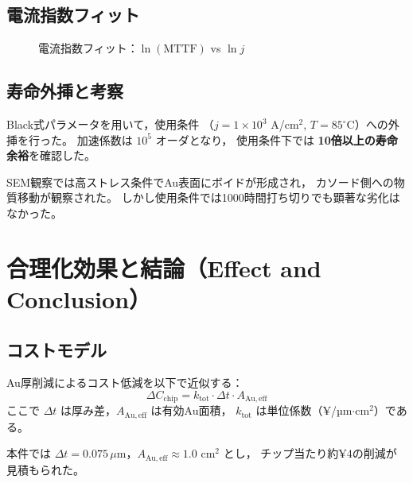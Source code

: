 \documentclass[conference]{IEEEtran}
\begin{document}
\subsection{電流指数フィット}
\begin{figure}[htbp]
  \centering
  \caption{電流指数フィット：$\ln(\mathrm{MTTF})$ vs $\ln j$}
  \label{fig:em-j}
\end{figure}

\subsection{寿命外挿と考察}
Black式パラメータを用いて，使用条件
（$j=1\times10^3$ A/cm$^2$, $T=85^\circ$C）への外挿を行った。
加速係数は $10^5$ オーダとなり，
使用条件下では \textbf{10倍以上の寿命余裕}を確認した。

SEM観察では高ストレス条件でAu表面にボイドが形成され，
カソード側への物質移動が観察された。
しかし使用条件では1000時間打ち切りでも顕著な劣化はなかった。

\section{合理化効果と結論（Effect and Conclusion）}

\subsection{コストモデル}
Au厚削減によるコスト低減を以下で近似する：
\begin{equation}
  \Delta C_{\mathrm{chip}}
  = k_{\mathrm{tot}} \cdot \Delta t \cdot A_{\mathrm{Au,eff}}
\end{equation}
ここで $\Delta t$ は厚み差，$A_{\mathrm{Au,eff}}$ は有効Au面積，
$k_{\mathrm{tot}}$ は単位係数（¥/µm$\cdot$cm$^2$）である。

本件では $\Delta t=0.075\,\mu$m，$A_{\mathrm{Au,eff}}\approx1.0$ cm$^2$ とし，
チップ当たり約¥4の削減が見積もられた。
\end{document}
